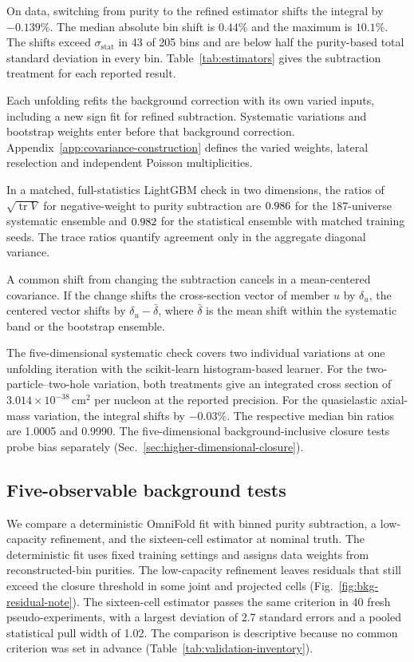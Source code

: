 On data, switching from purity to the refined estimator shifts the integral by $-0.139\%$. The median absolute bin shift is $0.44\%$ and the maximum is $10.1\%$. The shifts exceed $\sigma_{\mathrm{stat}}$ in 43 of 205 bins and are below half the purity-based total standard deviation in every bin. Table~\ref{tab:estimators} gives the subtraction treatment for each reported result.

Each unfolding refits the background correction with its own varied inputs, including a new sign fit for refined subtraction. Systematic variations and bootstrap weights enter before that background correction. Appendix~\ref{app:covariance-construction} defines the varied weights, lateral reselection and independent Poisson multiplicities.

In a matched, full-statistics LightGBM check in two dimensions, the ratios of $\sqrt{\operatorname{tr} V}$ for negative-weight to purity subtraction are $0.986$ for the 187-universe systematic ensemble and $0.982$ for the statistical ensemble with matched training seeds. The trace ratios quantify agreement only in the aggregate diagonal variance.

A common shift from changing the subtraction cancels in a mean-centered covariance. If the change shifts the cross-section vector of member $u$ by $\delta_u$, the centered vector shifts by $\delta_u-\bar\delta$, where $\bar\delta$ is the mean shift within the systematic band or the bootstrap ensemble.

The five-dimensional systematic check covers two individual variations at one unfolding iteration with the scikit-learn histogram-based learner. For the two-particle--two-hole variation, both treatments give an integrated cross section of $3.014\times10^{-38}\,\mathrm{cm}^2$ per nucleon at the reported precision. For the quasielastic axial-mass variation, the integral shifts by $-0.03\%$. The respective median bin ratios are 1.0005 and 0.9990. The five-dimensional background-inclusive closure tests probe bias separately (Sec.~\ref{sec:higher-dimensional-closure}).

\subsection{Five-observable background tests}

We compare a deterministic OmniFold fit with binned purity subtraction, a low-capacity refinement, and the sixteen-cell estimator at nominal truth. The deterministic fit uses fixed training settings and assigns data weights from reconstructed-bin purities. The low-capacity refinement leaves residuals that still exceed the closure threshold in some joint and projected cells (Fig.~\ref{fig:bkg-residual-note}). The sixteen-cell estimator passes the same criterion in 40 fresh pseudo-experiments, with a largest deviation of 2.7 standard errors and a pooled statistical pull width of 1.02. The comparison is descriptive because no common criterion was set in advance (Table~\ref{tab:validation-inventory}).

